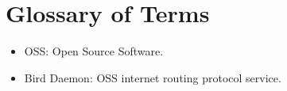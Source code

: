 \chapter*{Glossary of Terms}

\begin{itemize}
	\item OSS: Open Source Software.
	\item Bird Daemon: OSS internet routing protocol service.
\end{itemize}